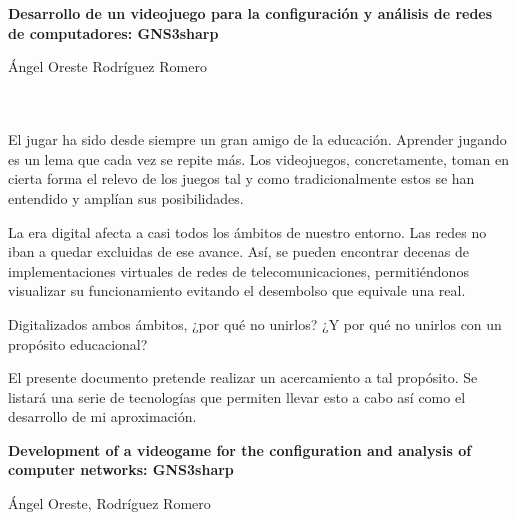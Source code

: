 \chapter*{}






\cleardoublepage
\thispagestyle{empty}

\begin{center}
{\large\bfseries Desarrollo de un videojuego para la configuración y análisis de redes de computadores: GNS3sharp}\\
\end{center}
\begin{center}
Ángel Oreste Rodríguez Romero\\
\end{center}

\\

\vspace{0.7cm}
\\

El jugar ha sido desde siempre un gran amigo de la educación. Aprender jugando es un lema que cada vez se repite más. Los videojuegos, concretamente, toman en cierta forma el relevo de los juegos tal y como tradicionalmente estos se han entendido y amplían sus posibilidades.

La era digital afecta a casi todos los ámbitos de nuestro entorno. Las redes no iban a quedar excluidas de ese avance. Así, se pueden encontrar decenas de implementaciones virtuales de redes de telecomunicaciones, permitiéndonos visualizar su funcionamiento evitando el desembolso que equivale una real.

Digitalizados ambos ámbitos, ¿por qué no unirlos? ¿Y por qué no unirlos con un propósito educacional?

El presente documento pretende realizar un acercamiento a tal propósito. Se listará una serie de tecnologías que permiten llevar esto a cabo así como el desarrollo de mi aproximación.
\cleardoublepage


\thispagestyle{empty}


\begin{center}
{\large\bfseries Development of a videogame for the configuration and analysis of computer networks: GNS3sharp}\\
\end{center}
\begin{center}
Ángel Oreste, Rodríguez Romero\\
\end{center}


